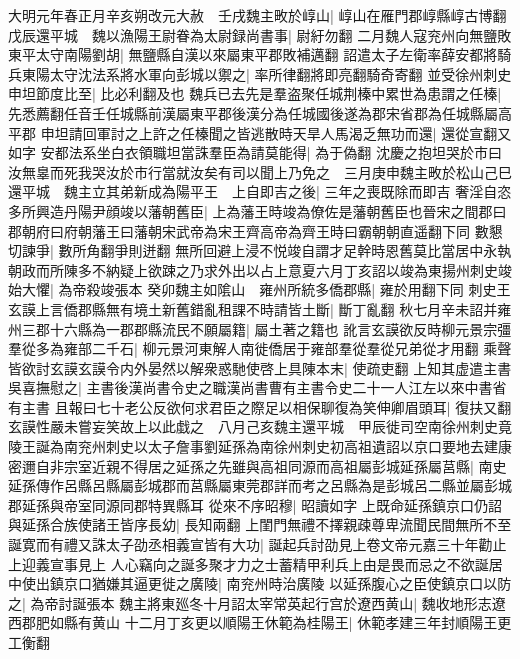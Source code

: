 大明元年春正月辛亥朔改元大赦　壬戌魏主畋於崞山|{
	崞山在雁門郡崞縣崞古博翻}
戊辰還平城　魏以漁陽王尉眷為太尉録尚書事|{
	尉紆勿翻}
二月魏人寇兖州向無鹽敗東平太守南陽劉胡|{
	無鹽縣自漢以來屬東平郡敗補邁翻}
詔遣太子左衛率薛安都將騎兵東陽太守沈法系將水軍向彭城以禦之|{
	率所律翻將即亮翻騎奇寄翻}
並受徐州刺史申坦節度比至|{
	比必利翻及也}
魏兵已去先是羣盗聚任城荆榛中累世為患謂之任榛|{
	先悉薦翻任音壬任城縣前漢屬東平郡後漢分為任城國後遂為郡宋省郡為任城縣屬高平郡}
申坦請回軍討之上許之任榛聞之皆逃散時天旱人馬渴乏無功而還|{
	還從宣翻又如字}
安都法系坐白衣領職坦當誅羣臣為請莫能得|{
	為于偽翻}
沈慶之抱坦哭於市曰汝無辠而死我哭汝於市行當就汝矣有司以聞上乃免之　三月庚申魏主畋於松山己巳還平城　魏主立其弟新成為陽平王　上自即吉之後|{
	三年之喪既除而即吉}
奢淫自恣多所興造丹陽尹顔竣以藩朝舊臣|{
	上為藩王時竣為僚佐是藩朝舊臣也晉宋之間郡曰郡朝府曰府朝藩王曰藩朝宋武帝為宋王齊高帝為齊王時曰霸朝朝直遥翻下同}
數懇切諫爭|{
	數所角翻爭則迸翻}
無所回避上浸不悦竣自謂才足幹時恩舊莫比當居中永執朝政而所陳多不納疑上欲踈之乃求外出以占上意夏六月丁亥詔以竣為東揚州刺史竣始大懼|{
	為帝殺竣張本}
癸卯魏主如隂山　雍州所統多僑郡縣|{
	雍於用翻下同}
刺史王玄謨上言僑郡縣無有境土新舊錯亂租課不時請皆土斷|{
	斷丁亂翻}
秋七月辛未詔并雍州三郡十六縣為一郡郡縣流民不願屬籍|{
	屬土著之籍也}
訛言玄謨欲反時柳元景宗彊羣從多為雍部二千石|{
	柳元景河東解人南徙僑居于雍部羣從羣從兄弟從才用翻}
乘聲皆欲討玄謨玄謨令内外晏然以解衆惑馳使啓上具陳本末|{
	使疏吏翻}
上知其虚遣主書吳喜撫慰之|{
	主書後漢尚書令史之職漢尚書曹有主書令史二十一人江左以來中書省有主書}
且報曰七十老公反欲何求君臣之際足以相保聊復為笑伸卿眉頭耳|{
	復扶又翻}
玄謨性嚴未嘗妄笑故上以此戱之　八月己亥魏主還平城　甲辰徙司空南徐州刺史竟陵王誕為南兖州刺史以太子詹事劉延孫為南徐州刺史初高祖遺詔以京口要地去建康密邇自非宗室近親不得居之延孫之先雖與高祖同源而高祖屬彭城延孫屬莒縣|{
	南史延孫傳作呂縣呂縣屬彭城郡而莒縣屬東莞郡詳而考之呂縣為是彭城呂二縣並屬彭城郡延孫與帝室同源同郡特異縣耳}
從來不序昭穆|{
	昭讀如字}
上既命延孫鎮京口仍詔與延孫合族使諸王皆序長幼|{
	長知兩翻}
上閨門無禮不擇親疎尊卑流聞民間無所不至誕寛而有禮又誅太子劭丞相義宣皆有大功|{
	誕起兵討劭見上卷文帝元嘉三十年勸止上迎義宣事見上}
人心竊向之誕多聚才力之士蓄精甲利兵上由是畏而忌之不欲誕居中使出鎮京口猶嫌其逼更徙之廣陵|{
	南兖州時治廣陵}
以延孫腹心之臣使鎮京口以防之|{
	為帝討誕張本}
魏主將東廵冬十月詔太宰常英起行宫於遼西黄山|{
	魏收地形志遼西郡肥如縣有黄山}
十二月丁亥更以順陽王休範為桂陽王|{
	休範孝建三年封順陽王更工衡翻}


